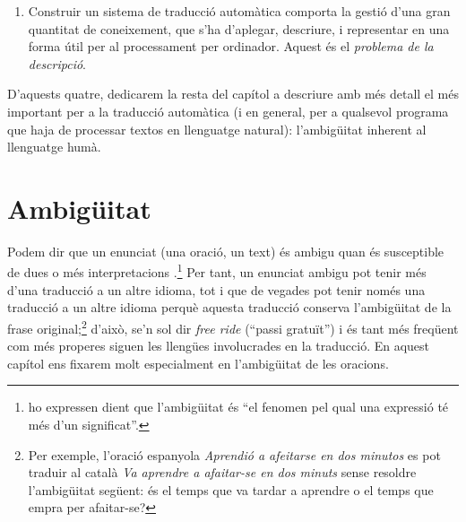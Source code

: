 \begin{enumerate}
\item Construir un sistema de traducció automàtica comporta la gestió
  d'una gran quantitat de coneixement, que s'ha d'aplegar, descriure,
  i representar en una forma útil per al processament per
  ordinador. Aquest és el \emph{problema de la descripció}.
\end{enumerate}


D'aquests quatre, dedicarem la resta del capítol a descriure amb més
detall el més important per a la traducció automàtica (i en general,
per a qualsevol programa que haja de processar textos en llenguatge
natural): l'ambigüitat inherent al llenguatge humà.

\section{Ambigüitat}

Podem dir que un enunciat (una oració, un text) és ambigu quan és
susceptible de dues o més interpretacions
\citep{alcaraz97b}.\footnote{\citet{don96u} ho expressen dient que
  l'ambigüitat és ``el fenomen pel qual una expressió té més d'un
  significat''.} Per tant, un enunciat ambigu pot tenir més d'una
traducció a un altre idioma, tot i que de vegades pot tenir només una
traducció a un altre idioma perquè aquesta traducció conserva
l'ambigüitat de la frase original;\footnote{Per exemple, l'oració
  espanyola \emph{Aprendió a afeitarse en dos minutos} es pot traduir
  al català \emph{Va aprendre a afaitar-se en dos minuts} sense
  resoldre l'ambigüitat següent: és el temps que va tardar a aprendre
  o el temps que empra per afaitar-se?}  d'això, se'n sol dir
\emph{free ride} (``passi gratuït'') i és tant més freqüent com més
properes siguen les llengües involucrades en la traducció. En aquest
capítol ens fixarem molt especialment en l'ambigüitat de les oracions.

